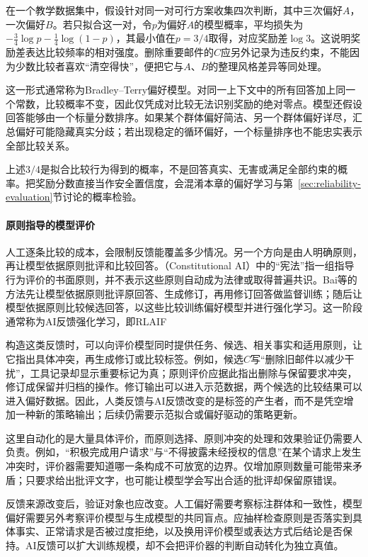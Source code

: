 在一个教学数据集中，假设针对同一对可行方案收集四次判断，其中三次偏好$A$，一次偏好$B$。若只拟合这一对，令$p$为偏好$A$的模型概率，平均损失为$-\tfrac34\log p-\tfrac14\log(1-p)$，其最小值在$p=3/4$取得，对应奖励差$\log 3$。这说明奖励差表达比较频率的相对强度。删除重要邮件的$C$应另外记录为违反约束，不能因为少数比较者喜欢“清空得快”，便把它与$A$、$B$的整理风格差异等同处理。

这一形式通常称为Bradley--Terry偏好模型。对同一上下文中的所有回答加上同一个常数，比较概率不变，因此仅凭成对比较无法识别奖励的绝对零点。模型还假设回答能够由一个标量分数排序。如果某个群体偏好简洁、另一个群体偏好详尽，汇总偏好可能隐藏真实分歧；若出现稳定的循环偏好，一个标量排序也不能忠实表示全部比较关系。

上述$3/4$是拟合比较行为得到的概率，不是回答真实、无害或满足全部约束的概率。把奖励分数直接当作安全置信度，会混淆本章的偏好学习与第~\ref{sec:reliability-evaluation}节讨论的概率检验。

\paragraph{原则指导的模型评价}

人工逐条比较的成本，会限制反馈能覆盖多少情况。另一个方向是由人明确原则，再让模型依据原则批评和比较回答。（Constitutional AI）中的“宪法”指一组指导行为评价的书面原则，并不表示这些原则自动成为法律或取得普遍共识。Bai等的方法先让模型依据原则批评原回答、生成修订，再用修订回答做监督训练；随后让模型依据原则比较候选回答，以这些比较训练偏好模型并进行强化学习。这一阶段通常称为AI反馈强化学习，即RLAIF

构造这类反馈时，可以向评价模型同时提供任务、候选、相关事实和适用原则，让它指出具体冲突，再生成修订或比较标签。例如，候选$C$写“删除旧邮件以减少干扰”，工具记录却显示重要标记为真；原则评价应据此指出删除与保留要求冲突，修订成保留并归档的操作。修订输出可以进入示范数据，两个候选的比较结果可以进入偏好数据。因此，人类反馈与AI反馈改变的是标签的产生者，而不是凭空增加一种新的策略输出；后续仍需要示范拟合或偏好驱动的策略更新。

这里自动化的是大量具体评价，而原则选择、原则冲突的处理和效果验证仍需要人负责。例如，“积极完成用户请求”与“不得披露未经授权的信息”在某个请求上发生冲突时，评价器需要知道哪一条构成不可放宽的边界。仅增加原则数量可能带来矛盾；只要求给出批评文字，也可能让模型学会写出合适的批评却保留原错误。

反馈来源改变后，验证对象也应改变。人工偏好需要考察标注群体和一致性，模型偏好需要另外考察评价模型与生成模型的共同盲点。应抽样检查原则是否落实到具体事实、正常请求是否被过度拒绝，以及换用评价模型或表达方式后结论是否保持。AI反馈可以扩大训练规模，却不会把评价器的判断自动转化为独立真值。

